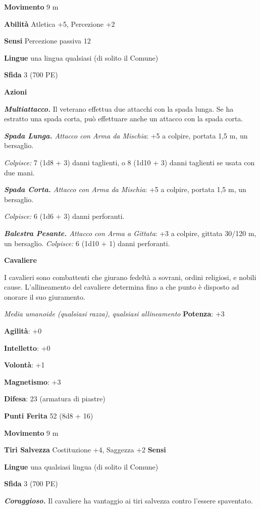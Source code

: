 \begin{multicols}{2}
\textbf{Movimento} 9 m

\textbf{Abilità} Atletica +5, Percezione +2

\textbf{Sensi} Percezione passiva 12

\textbf{Lingue} una lingua qualsiasi (di solito il Comune)

\textbf{Sfida} 3 (700 PE)

\textbf{Azioni}

\emph{\textbf{Multiattacco.}} Il veterano effettua due attacchi con la
spada lunga. Se ha estratto una spada corta, può effettuare anche un
attacco con la spada corta.

\emph{\textbf{Spada Lunga.} Attacco con Arma da Mischia}: +5 a colpire,
portata 1,5 m, un bersaglio.

\emph{Colpisce:} 7 (1d8 + 3) danni taglienti, o 8 (1d10 + 3) danni
taglienti se usata con due mani.

\emph{\textbf{Spada Corta.} Attacco con Arma da Mischia}: +5 a colpire,
portata 1,5 m, un bersaglio.

\emph{Colpisce:} 6 (1d6 + 3) danni perforanti.

\emph{\textbf{Balestra Pesante.} Attacco con Arma a Gittata}: +3 a
colpire, gittata 30/120 m, un bersaglio. \emph{Colpisce:} 6 (1d10 + 1)
danni perforanti.

\textbf{Cavaliere}

I cavalieri sono combattenti che giurano fedeltà a sovrani, ordini
religiosi, e nobili cause. L'allineamento del cavaliere determina fino a
che punto è disposto ad onorare il suo giuramento.

\emph{Media umanoide (qualsiasi razza), qualsiasi allineamento}
\textbf{Potenza}: +3

\textbf{Agilità}: +0

\textbf{Intelletto}: +0

\textbf{Volontà}: +1

\textbf{Magnetismo}: +3

\textbf{Difesa}: 23 (armatura di piastre)

\textbf{Punti Ferita} 52 (8d8 + 16)

\textbf{Movimento} 9 m

\textbf{Tiri Salvezza} Costituzione +4, Saggezza +2 \textbf{Sensi}


\textbf{Lingue} una qualsiasi lingua (di solito il Comune)

\textbf{Sfida} 3 (700 PE)

\emph{\textbf{Coraggioso.}} Il cavaliere ha vantaggio ai tiri salvezza
contro l'essere spaventato.


\end{multicols}
